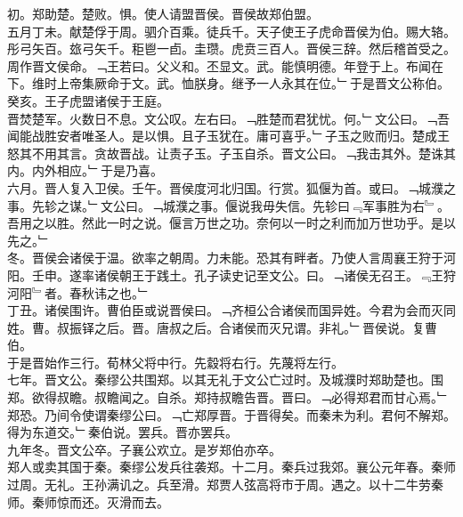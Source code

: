 \documentclass{zhvt-classic}
\begin{document}
\hspace*{2em}初。郑助楚。楚败。惧。使人请盟晋侯。晋侯故郑伯盟。\\
\hspace*{2em}五月丁未。献楚俘于周。驷介百乘。徒兵千。天子使王子虎命晋侯为伯。赐大辂。彤弓矢百。玈弓矢千。秬鬯一卣。圭瓒。虎贲三百人。晋侯三辞。然后稽首受之。周作晋文侯命。﹁王若曰。父义和。丕显文。武。能慎明德。年登于上。布闻在下。维时上帝集厥命于文。武。恤朕身。继予一人永其在位。﹂于是晋文公称伯。癸亥。王子虎盟诸侯于王庭。\\
\hspace*{2em}晋焚楚军。火数日不息。文公叹。左右曰。﹁胜楚而君犹忧。何。﹂文公曰。﹁吾闻能战胜安者唯圣人。是以惧。且子玉犹在。庸可喜乎。﹂子玉之败而归。楚成王怒其不用其言。贪故晋战。让责子玉。子玉自杀。晋文公曰。﹁我击其外。楚诛其内。内外相应。﹂于是乃喜。\\
\hspace*{2em}六月。晋人复入卫侯。壬午。晋侯度河北归国。行赏。狐偃为首。或曰。﹁城濮之事。先轸之谋。﹂文公曰。﹁城濮之事。偃说我毋失信。先轸曰﹃军事胜为右﹄。吾用之以胜。然此一时之说。偃言万世之功。奈何以一时之利而加万世功乎。是以先之。﹂\\
\hspace*{2em}冬。晋侯会诸侯于温。欲率之朝周。力未能。恐其有畔者。乃使人言周襄王狩于河阳。壬申。遂率诸侯朝王于践土。孔子读史记至文公。曰。﹁诸侯无召王。﹃王狩河阳﹄者。春秋讳之也。﹂\\
\hspace*{2em}丁丑。诸侯围许。曹伯臣或说晋侯曰。﹁齐桓公合诸侯而国异姓。今君为会而灭同姓。曹。叔振铎之后。晋。唐叔之后。合诸侯而灭兄谓。非礼。﹂晋侯说。复曹伯。\\
\hspace*{2em}于是晋始作三行。荀林父将中行。先縠将右行。先蔑将左行。\\
\hspace*{2em}七年。晋文公。秦缪公共围郑。以其无礼于文公亡过时。及城濮时郑助楚也。围郑。欲得叔瞻。叔瞻闻之。自杀。郑持叔瞻告晋。晋曰。﹁必得郑君而甘心焉。﹂郑恐。乃间令使谓秦缪公曰。﹁亡郑厚晋。于晋得矣。而秦未为利。君何不解郑。得为东道交。﹂秦伯说。罢兵。晋亦罢兵。\\
\hspace*{2em}九年冬。晋文公卒。子襄公欢立。是岁郑伯亦卒。\\
\hspace*{2em}郑人或卖其国于秦。秦缪公发兵往袭郑。十二月。秦兵过我郊。襄公元年春。秦师过周。无礼。王孙满讥之。兵至滑。郑贾人弦高将市于周。遇之。以十二牛劳秦师。秦师惊而还。灭滑而去。\\
\end{document}
